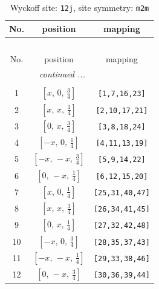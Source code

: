 \documentclass[fleqn,8pt]{jsarticle}
\begin{document}
\begin{longtable}{ccc}
\caption{Wyckoff site: {\tt 12j}, site symmetry: {\tt m2m}}
 \\
 \hline \hline
No. & position & mapping \\ \hline \endfirsthead

\multicolumn{2}{l}{\tablename\ \thetable{}} \\
 \hline \hline
No. & position & mapping \\ \hline \endhead

 \hline \hline
\multicolumn{2}{r}{\footnotesize\it continued ...} \\ \endfoot

 \hline \hline
\multicolumn{2}{r}{} \\ \endlastfoot

1 & $\left[ x,\, 0,\, \frac{3}{4} \right]$ & {\tt [1,7,16,23]} \\ \hline
2 & $\left[ x,\, x,\, \frac{1}{4} \right]$ & {\tt [2,10,17,21]} \\ \hline
3 & $\left[ 0,\, x,\, \frac{3}{4} \right]$ & {\tt [3,8,18,24]} \\ \hline
4 & $\left[ - x,\, 0,\, \frac{1}{4} \right]$ & {\tt [4,11,13,19]} \\ \hline
5 & $\left[ - x,\, - x,\, \frac{3}{4} \right]$ & {\tt [5,9,14,22]} \\ \hline
6 & $\left[ 0,\, - x,\, \frac{1}{4} \right]$ & {\tt [6,12,15,20]} \\ \hline
7 & $\left[ x,\, 0,\, \frac{1}{4} \right]$ & {\tt [25,31,40,47]} \\ \hline
8 & $\left[ x,\, x,\, \frac{3}{4} \right]$ & {\tt [26,34,41,45]} \\ \hline
9 & $\left[ 0,\, x,\, \frac{1}{4} \right]$ & {\tt [27,32,42,48]} \\ \hline
10 & $\left[ - x,\, 0,\, \frac{3}{4} \right]$ & {\tt [28,35,37,43]} \\ \hline
11 & $\left[ - x,\, - x,\, \frac{1}{4} \right]$ & {\tt [29,33,38,46]} \\ \hline
12 & $\left[ 0,\, - x,\, \frac{3}{4} \right]$ & {\tt [30,36,39,44]} \\
\end{longtable}
\renewcommand{\arraystretch}{1.2}
\end{document}
